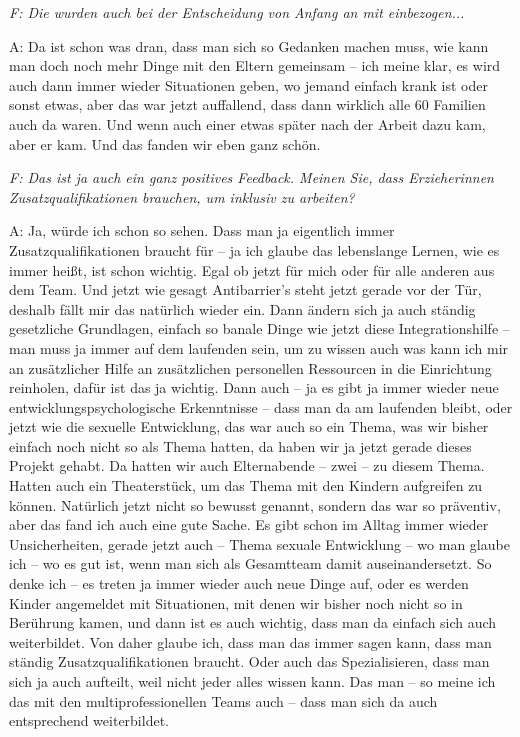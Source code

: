 \emph{F: Die wurden auch bei der Entscheidung von Anfang an mit einbezogen...}

A: Da ist schon was dran, dass man sich so Gedanken machen muss, wie kann man doch noch mehr Dinge mit den Eltern gemeinsam – ich meine klar, es wird auch dann immer wieder Situationen geben, wo jemand einfach krank ist oder sonst etwas, aber das war jetzt auffallend, dass dann wirklich alle 60 Familien auch da waren. Und wenn auch einer etwas später nach der Arbeit dazu kam, aber er kam. Und das fanden wir eben ganz schön.

\emph{F: Das ist ja auch ein ganz positives Feedback.
Meinen Sie, dass Erzieherinnen Zusatzqualifikationen brauchen, um inklusiv zu arbeiten?}

A: Ja, würde ich schon so sehen. Dass man ja eigentlich immer Zusatzqualifikationen braucht für – ja ich glaube das lebenslange Lernen, wie es immer heißt, ist schon wichtig. Egal ob jetzt für  mich oder für alle anderen aus dem Team. Und jetzt wie gesagt Antibarrier's steht jetzt gerade vor der Tür,  deshalb fällt mir das natürlich wieder ein. Dann ändern sich ja auch ständig gesetzliche Grundlagen, einfach so banale Dinge wie jetzt diese Integrationshilfe – man muss ja immer auf dem laufenden sein, um zu wissen auch was kann ich mir an zusätzlicher Hilfe an zusätzlichen personellen Ressourcen in die Einrichtung reinholen, dafür ist das ja wichtig. Dann auch – ja es gibt ja immer wieder neue entwicklungspsychologische Erkenntnisse – dass man da am laufenden bleibt, oder jetzt wie die sexuelle Entwicklung, das war auch so ein Thema, was wir bisher einfach noch nicht so als Thema hatten, da haben wir ja jetzt gerade dieses Projekt gehabt. Da hatten wir auch Elternabende – zwei – zu diesem Thema. Hatten auch ein Theaterstück, um das Thema mit den Kindern aufgreifen zu können. Natürlich jetzt nicht so bewusst genannt, sondern das war so präventiv, aber das fand ich auch eine gute Sache. Es gibt schon im Alltag immer wieder Unsicherheiten, gerade jetzt auch – Thema sexuale Entwicklung – wo man glaube ich – wo es gut ist, wenn man sich als Gesamtteam damit auseinandersetzt. So denke ich – es treten ja immer wieder auch neue Dinge auf, oder es werden Kinder angemeldet mit Situationen, mit denen wir bisher noch nicht so in Berührung kamen, und dann ist es auch wichtig, dass man da einfach sich auch weiterbildet. Von daher glaube ich, dass man das immer sagen kann, dass man ständig Zusatzqualifikationen braucht. Oder auch das Spezialisieren, dass man sich ja auch aufteilt, weil nicht jeder alles wissen kann. Das man – so meine ich das mit den multiprofessionellen Teams auch – dass man sich da auch entsprechend weiterbildet.

